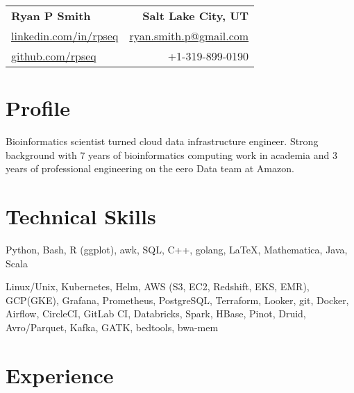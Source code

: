 
\RequirePackage{preamble}



\begin{tabular*}{\textwidth}{l@{\extracolsep{\fill}}r}
	\textbf{{\Large Ryan P Smith}} & \textbf{Salt Lake City, UT} \\
	\href{http://www.linkedin.com/in/rpseq}{linkedin.com/in/rpseq} &
	\href{mailto:ryan.smith.p@gmail.com}{ryan.smith.p@gmail.com} \\
	\href{https://github.com/RPSeq}{github.com/rpseq} & +1-319-899-0190 \\
\end{tabular*}

\section{Profile}

\small{Bioinformatics scientist turned cloud data infrastructure engineer. Strong background with 7 years of bioinformatics computing work in academia and 3 years of professional engineering on the eero Data team at Amazon.}


\section{Technical Skills}
\resumeSubHeadingListStart

{Python, Bash, R (ggplot), awk, SQL, C++, golang, \LaTeX, Mathematica, Java, Scala}

{Linux/Unix, Kubernetes, Helm, AWS (S3, EC2, Redshift, EKS, EMR), GCP(GKE), Grafana, Prometheus, PostgreSQL, Terraform, Looker, git, Docker, Airflow, CircleCI, GitLab CI, Databricks, Spark, HBase, Pinot, Druid, Avro/Parquet, Kafka, GATK, bedtools, bwa-mem}

\resumeSubHeadingListEnd

\section{Experience}
\resumeSubHeadingListStart

